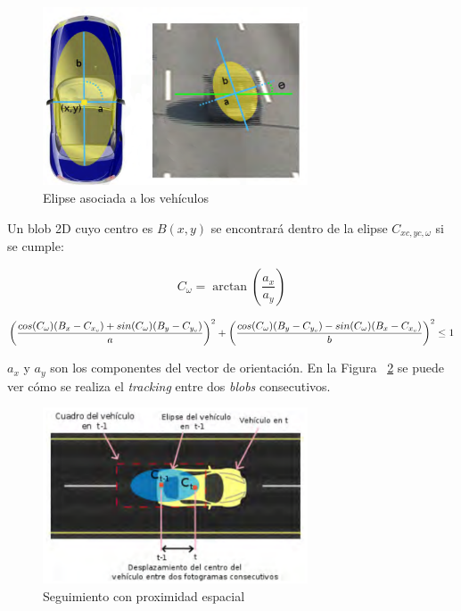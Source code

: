  \begin{figure}[H] 
\begin{center}
    \includegraphics[width=0.7\textwidth]{figures/Diseno_global/elipse.png}
   \caption{Elipse asociada a los vehículos}
	\label{fig.elipse}
\end{center}
\end{figure}

Un blob 2D cuyo centro es $B(x,y)$ se encontrará dentro de la elipse  $C_{xc,yc,\omega}$ si se cumple:

\begin{equation}\label{ec.blob_elipse}
   C_{\omega} = \arctan(\frac{a_x}{a_y})
\end{equation}

\begin{equation} \scriptsize \label{ec.blob_elipse1}
   \left(\frac{cos(C_\omega)(B_x - C_{x_c}) + sin(C_\omega)(B_y - C_{y_c})}{a} \right)^2 + \left(\frac{cos(C_\omega)(B_y - C_{y_c}) - sin(C_\omega)(B_x - C_{x_c})}{b} \right)^2 \leq 1
\end{equation}

$a_x$ y $a_y$ son los componentes del vector de orientación. En la Figura ~\ref{fig.emparejamiento_blob} se puede ver cómo se realiza el \textit{tracking} entre dos \textit{blobs} consecutivos. 

 \begin{figure}[H] 
\begin{center}
   \includegraphics[width=0.7\textwidth]{figures/Diseno_global/emparejamiento_blob.png}
   \caption{Seguimiento con proximidad espacial}
	\label{fig.emparejamiento_blob}
\end{center}
\end{figure}


